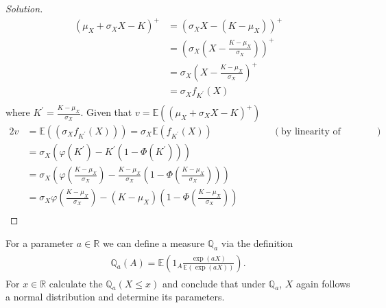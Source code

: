 \documentclass[10pt]{article}
\newcommand{\E}{\mathbb{E}}
\newcommand{\Q}{\mathbb{Q}}
\newcommand{\R}{\mathbb{R}}
\newenvironment{problem}[2][Problem]{\begin{trivlist}
\item[\hskip \labelsep {\bfseries #1}\hskip \labelsep {\bfseries #2.}]}{\end{trivlist}}
\begin{document}
\begin{proof}[Solution]
    \begin{align*}
        (\mu_X + \sigma_X X - K)^+ &= (\sigma_X X - (K - \mu_X))^+ \\
        &= \left(\sigma_X {\left(X - \frac{K - \mu_X}{\sigma_X}\right)}\right)^+ \\
        &= \sigma_X {\left(X - \frac{K - \mu_X}{\sigma_X}\right)^+} \\
        &= \sigma_X f_{K^\prime} (X) \\
    \end{align*}
    where $K^\prime = \frac{K - \mu_X}{\sigma_X}$. Given that $v = \E \left((\mu_X + \sigma_X X - K)^+\right)$
    \begin{alignat*}{2}
        v &= \E((\sigma_X f_{K^\prime} (X))) = \sigma_X \E(f_{K^\prime} (X)) && \qquad (\text{by linearity of expectation}) \\
        &= \sigma_X {(\varphi(K^\prime) - K^\prime(1 - \Phi(K^\prime)))} \\
        &= \sigma_X {\left(\varphi\left(\frac{K - \mu_X}{\sigma_X}\right) - \frac{K - \mu_X}{\sigma_X}\left(1 - \Phi\left(\frac{K - \mu_X}{\sigma_X}\right)\right)\right)} \\
        &= \sigma_X \varphi\left(\frac{K - \mu_X}{\sigma_X}\right) - (K - \mu_X)\left(1 - \Phi\left(\frac{K - \mu_X}{\sigma_X}\right)\right) \\
    \end{alignat*}
\end{proof}



\begin{problem}{3}
    For a parameter $a \in \R$ we can define a measure $\Q_a$ via the definition
    \begin{align*}
        \begin{split}
            \Q_a (A) = \E{\left(1_A \frac{\exp(aX)}{\E(\exp(aX))}\right)}.
        \end{split}
    \end{align*}
    For $x \in \R$ calculate the $\Q_a (X \leq x)$ and conclude that under $\Q_a$, $X$ again follows a normal distribution and determine its parameters.
\end{problem}
    
\end{document}
